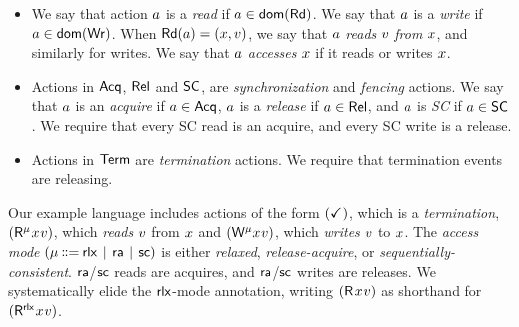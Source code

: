 %
%
  \begin{itemize}    
  \item We say that action $a$ is a \emph{read} if
    $a\in\mathsf{dom}(\mathsf{Rd})$. We say that $a$ is a \emph{write} if
    $a\in\mathsf{dom}(\mathsf{Wr})$.  When $\mathsf{Rd}(a) = (x,v)$,
    we say that $a$ \emph{reads} $v$ \emph{from} $x$, and
    similarly for writes.  We say that $a$ \emph{accesses} $x$ if it
    reads or writes $x$.

  \item Actions in $\mathsf{Acq}$, $\mathsf{Rel}$ and $\mathsf{SC}$, are \emph{synchronization} and
    \emph{fencing} actions.  We say that $a$ is an \emph{acquire} if
    $a\in\mathsf{Acq}$, $a$ is a \emph{release} if $a\in\mathsf{Rel}$, and
    $a$ is \emph{SC} if $a\in\mathsf{SC}$.  We require that every SC read is
    an acquire, and every SC write is a release.

    
  \item Actions in $\mathsf{Term}$ are \emph{termination} actions. We
    require %
    that termination events are releasing.
  \end{itemize}

  Our example language includes actions of the form $(\checkmark_{})$, which is a
  \emph{termination}, $(\DR[\amode][\aThrd]{\aLoc}{\aVal})$, which
  \emph{reads} $v$ from $x$ and
  $(\DW[\amode][\aThrd]{\aLoc}{\aVal})$, which \emph{writes} $v$ to
  $x$.
The \emph{access mode} $(\amode \!\!\BNFDEF\!\! \modeRLX \!\BNFSEP\! \modeRA \!\BNFSEP\! \modeSC)$ is
either \emph{relaxed}, \emph{release-acquire}, or
\emph{sequentially-consistent}.
${\mathsf{ra}}$/${\mathsf{sc}}$ reads are acquires, and ${\mathsf{ra}}$/${\mathsf{sc}}$ writes are releases.
We systematically elide the ${\mathsf{rlx}}$-mode annotation, writing $(\DR{\aLoc}{\aVal})$
as shorthand for $(\DR[\modeRLX]{\aLoc}{\aVal})$.


